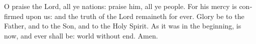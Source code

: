\begin{otherlanguage}{english}O praise the Lord, all ye nations: praise him, all ye people. For his mercy is confirmed upon us: and the truth of the Lord remaineth for ever. Glory be to the Father, and to the Son, and to the Holy Spirit. As it was in the beginning, is now, and ever shall be: world without end. Amen.\end{otherlanguage}